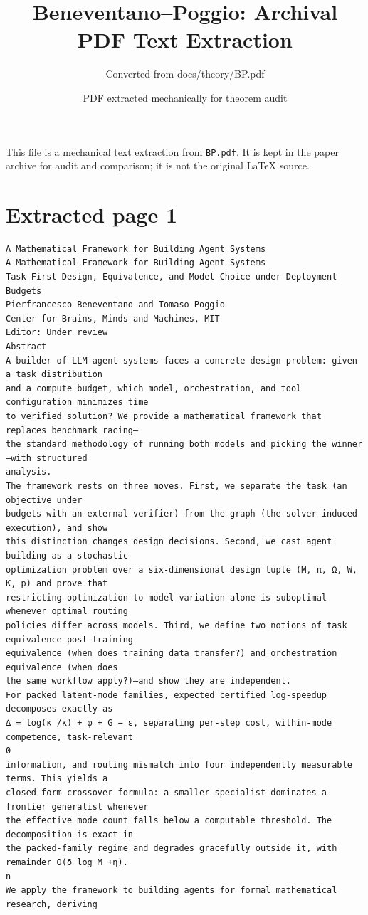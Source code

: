 \documentclass[11pt]{article}
\title{Beneventano--Poggio: Archival PDF Text Extraction}
\author{Converted from docs/theory/BP.pdf}
\date{PDF extracted mechanically for theorem audit}
\begin{document}
\maketitle

\noindent This file is a mechanical text extraction from \texttt{BP.pdf}. It is
kept in the paper archive for audit and comparison; it is not the original
LaTeX source.

\clearpage
\section*{Extracted page 1}
\begin{verbatim}
A Mathematical Framework for Building Agent Systems
A Mathematical Framework for Building Agent Systems
Task-First Design, Equivalence, and Model Choice under Deployment
Budgets
Pierfrancesco Beneventano and Tomaso Poggio
Center for Brains, Minds and Machines, MIT
Editor: Under review
Abstract
A builder of LLM agent systems faces a concrete design problem: given a task distribution
and a compute budget, which model, orchestration, and tool configuration minimizes time
to verified solution? We provide a mathematical framework that replaces benchmark racing—
the standard methodology of running both models and picking the winner—with structured
analysis.
The framework rests on three moves. First, we separate the task (an objective under
budgets with an external verifier) from the graph (the solver-induced execution), and show
this distinction changes design decisions. Second, we cast agent building as a stochastic
optimization problem over a six-dimensional design tuple (M, π, Ω, W, K, p) and prove that
restricting optimization to model variation alone is suboptimal whenever optimal routing
policies differ across models. Third, we define two notions of task equivalence—post-training
equivalence (when does training data transfer?) and orchestration equivalence (when does
the same workflow apply?)—and show they are independent.
For packed latent-mode families, expected certified log-speedup decomposes exactly as
∆ = log(κ /κ) + φ + G − ε, separating per-step cost, within-mode competence, task-relevant
0
information, and routing mismatch into four independently measurable terms. This yields a
closed-form crossover formula: a smaller specialist dominates a frontier generalist whenever
the effective mode count falls below a computable threshold. The decomposition is exact in
the packed-family regime and degrades gracefully outside it, with remainder O(δ log M +η).
n
We apply the framework to building agents for formal mathematical research, deriving

\end{verbatim}
\end{document}
